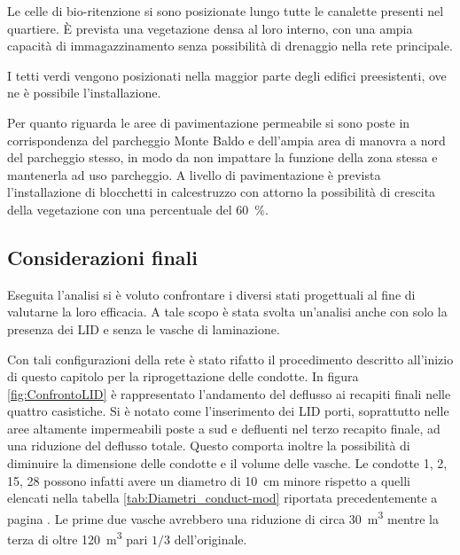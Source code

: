 Le celle di bio-ritenzione si sono posizionate lungo tutte le canalette presenti nel quartiere. 
È prevista una vegetazione densa al loro interno, con una ampia capacità di immagazzinamento senza possibilità di drenaggio nella rete principale.

I tetti verdi vengono posizionati nella maggior parte degli edifici preesistenti, ove ne è possibile l'installazione. 

Per quanto riguarda le aree di pavimentazione permeabile si sono poste in corrispondenza del parcheggio Monte Baldo e dell'ampia area di manovra a nord del parcheggio stesso, in modo da non impattare la funzione della zona stessa e mantenerla ad uso parcheggio.
A livello di pavimentazione è prevista l'installazione di blocchetti in calcestruzzo con attorno la possibilità di crescita della vegetazione con una percentuale del \SI{60}{\percent}.

\subsection{Considerazioni finali}
Eseguita l'analisi si è voluto confrontare i diversi stati progettuali al fine di valutarne la loro  efficacia. 
A tale scopo è stata svolta un'analisi anche con solo la presenza dei LID e senza le vasche di laminazione.

Con tali configurazioni della rete è stato rifatto il procedimento descritto all'inizio di questo capitolo per la riprogettazione delle condotte. 
In figura \ref{fig:ConfrontoLID} è rappresentato l'andamento del deflusso ai recapiti finali nelle quattro casistiche.
Si è notato come l'inserimento dei LID porti, soprattutto nelle aree altamente impermeabili poste a sud e defluenti nel terzo recapito finale, ad una riduzione del deflusso totale. 
Questo comporta inoltre la possibilità di diminuire la dimensione delle condotte e il volume delle vasche. Le condotte 1, 2, 15, 28 possono infatti avere un diametro di \SI{10}{\centi\metre} minore rispetto a quelli elencati nella tabella \ref{tab:Diametri_conduct-mod} riportata precedentemente a pagina \pageref{tab:Diametri_conduct-mod}. 
Le prime due vasche avrebbero una riduzione di circa \SI{30}{\metre\cubed} mentre la terza di oltre \SI{120}{\metre\cubed} pari $1/3$ dell'originale.


